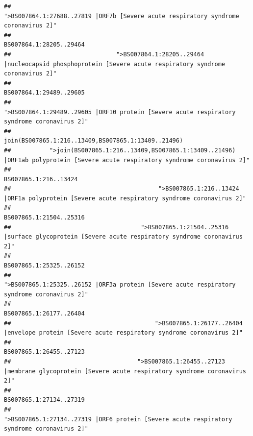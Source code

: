 \documentclass[
]{article}
\begin{document}
\begin{verbatim}
##                                                    ">BS007864.1:27688..27819 |ORF7b [Severe acute respiratory syndrome coronavirus 2]" 
##                                                                                                                BS007864.1:28205..29464 
##                              ">BS007864.1:28205..29464 |nucleocapsid phosphoprotein [Severe acute respiratory syndrome coronavirus 2]" 
##                                                                                                                BS007864.1:29489..29605 
##                                            ">BS007864.1:29489..29605 |ORF10 protein [Severe acute respiratory syndrome coronavirus 2]" 
##                                                                                    join(BS007865.1:216..13409,BS007865.1:13409..21496) 
##           ">join(BS007865.1:216..13409,BS007865.1:13409..21496) |ORF1ab polyprotein [Severe acute respiratory syndrome coronavirus 2]" 
##                                                                                                                  BS007865.1:216..13424 
##                                          ">BS007865.1:216..13424 |ORF1a polyprotein [Severe acute respiratory syndrome coronavirus 2]" 
##                                                                                                                BS007865.1:21504..25316 
##                                     ">BS007865.1:21504..25316 |surface glycoprotein [Severe acute respiratory syndrome coronavirus 2]" 
##                                                                                                                BS007865.1:25325..26152 
##                                            ">BS007865.1:25325..26152 |ORF3a protein [Severe acute respiratory syndrome coronavirus 2]" 
##                                                                                                                BS007865.1:26177..26404 
##                                         ">BS007865.1:26177..26404 |envelope protein [Severe acute respiratory syndrome coronavirus 2]" 
##                                                                                                                BS007865.1:26455..27123 
##                                    ">BS007865.1:26455..27123 |membrane glycoprotein [Severe acute respiratory syndrome coronavirus 2]" 
##                                                                                                                BS007865.1:27134..27319 
##                                             ">BS007865.1:27134..27319 |ORF6 protein [Severe acute respiratory syndrome coronavirus 2]" 

\end{verbatim}
\end{document}
